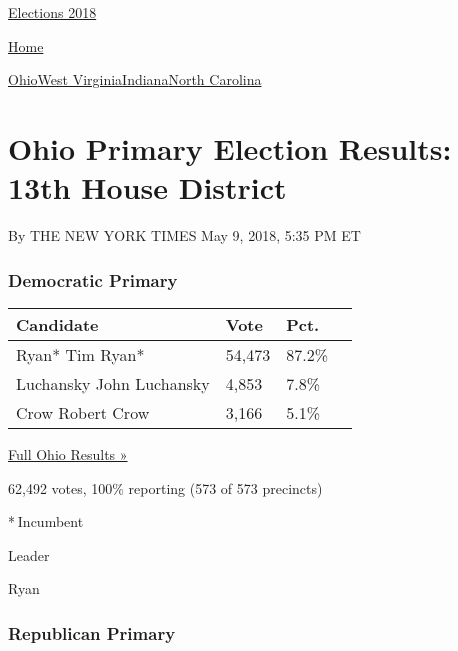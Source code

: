 \href{//www.nytimes3xbfgragh.onion}{}\href{https://www.nytimes3xbfgragh.onion/interactive/2018/us/elections/calendar-primary-results.html}{
Elections 2018}

\href{//www.nytimes3xbfgragh.onion}{ Home}

\href{https://www.nytimes3xbfgragh.onion/interactive/2018/05/08/us/elections/results-ohio-primary-elections.html}{Ohio}\href{https://www.nytimes3xbfgragh.onion/interactive/2018/05/08/us/elections/results-west-virginia-primary-elections.html}{West
Virginia}\href{https://www.nytimes3xbfgragh.onion/interactive/2018/05/08/us/elections/results-indiana-primary-elections.html}{Indiana}\href{https://www.nytimes3xbfgragh.onion/interactive/2018/05/08/us/elections/results-north-carolina-primary-elections.html}{North
Carolina}

\hypertarget{ohio-primary-election-results-13th-house-district}{%
\section{Ohio Primary Election Results: 13th House
District}\label{ohio-primary-election-results-13th-house-district}}

By THE NEW YORK TIMES May 9, 2018, 5:35 PM ET

\hypertarget{democratic-primary}{%
\subsubsection{Democratic Primary}\label{democratic-primary}}

\begin{longtable}[]{@{}llll@{}}
\toprule
Candidate & Vote & Pct. &\tabularnewline
\midrule
\endhead
 Ryan* Tim Ryan* & 54,473 & 87.2\% &\tabularnewline
 Luchansky John Luchansky & 4,853 & 7.8\% &\tabularnewline
 Crow Robert Crow & 3,166 & 5.1\% &\tabularnewline
\bottomrule
\end{longtable}

\href{https://www.nytimes3xbfgragh.onion/elections/results/ohio}{Full
Ohio Results »}

62,492 votes, 100\% reporting (573 of 573 precincts)

* Incumbent

Leader

 Ryan

\hypertarget{republican-primary}{%
\subsubsection{Republican Primary}\label{republican-primary}}

